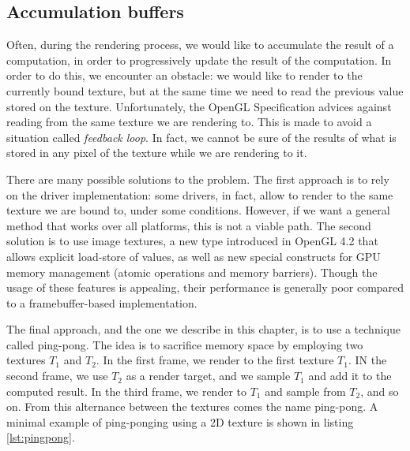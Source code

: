 \subsection{Accumulation buffers}

Often, during the rendering process, we would like to accumulate the result of a computation, in order to progressively update the result of the computation. In order to do this, we encounter an obstacle: we would like to render to the currently bound texture, but at the same time we need to read the previous value stored on the texture. Unfortunately, the OpenGL Specification \citep{openglspec} advices against reading from the same texture we are rendering to. This is made to avoid a situation called \emph{feedback loop}. In fact, we cannot be sure of the results of what is stored in any pixel of the texture while we are rendering to it. 

There are many possible solutions to the problem. The first approach is to rely on the driver implementation: some drivers, in fact, allow to render to the same texture we are bound to, under some conditions. However, if we want a general method that works over all platforms, this is not a viable path. The second solution is to use image textures, a new type introduced in OpenGL 4.2 that allows explicit load-store of values, as well as new special constructs for GPU memory management (atomic operations and memory barriers). Though the usage of these features is appealing, their performance is generally poor compared to a framebuffer-based implementation. 

The final approach, and the one we describe in this chapter, is to use a technique called ping-pong. The idea is to sacrifice memory space by employing two textures $T_1$ and $T_2$. In the first frame, we render to the first texture $T_1$. IN the second frame, we use $T_2$ as a render target, and we sample $T_1$ and add it to the computed result. In the third frame, we render to $T_1$ and sample from $T_2$, and so on. From this alternance between the textures comes the name ping-pong. A minimal example of ping-ponging using a 2D texture is shown in listing \ref{lst:pingpong}.

